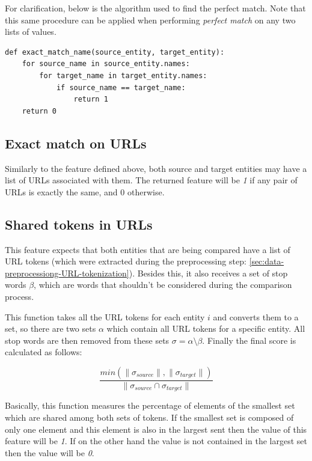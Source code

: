 \documentclass[epsfig,a4paper,11pt,titlepage,twoside,openany]{book}
\begin{document}
For clarification, below is the algorithm used to find the perfect match. Note that this same procedure can be applied when performing \textit{perfect match} on any two lists of values.

\begin{lstlisting}
def exact_match_name(source_entity, target_entity):
    for source_name in source_entity.names:
        for target_name in target_entity.names:
            if source_name == target_name:
                return 1
    return 0
\end{lstlisting}

\subsection{Exact match on URLs}
\label{sec:feature-exact-match-urls}

Similarly to the feature defined above, both source and target entities may have a list of URLs associated with them. The returned feature will be \textit{1} if any pair of URLs is exactly the same, and 0 otherwise.

\subsection{Shared tokens in URLs}
\label{sec:feature-shared-tokens-plus-urls}

This feature expects that both entities that are being compared have a list of URL tokens (which were extracted during the preprocessing step: \autoref{sec:data-preprocessiong-URL-tokenization}). Besides this, it also receives a set of stop words $\beta$, which are words that shouldn't be considered during the comparison process.

This function takes all the URL tokens for each entity $i$ and converts them to a set, so there are two sets $\alpha$ which contain all URL tokens for a specific entity. All stop words are then removed from these sets $\sigma = \alpha
\setminus \beta$. Finally the final score is calculated as follows:

\begin{equation*}
    \frac{
        min(\|\sigma_{source}\|, \|\sigma_{target}\|)}
        {\|\sigma_{source} \cap \sigma_{target}\|}
\end{equation*}

Basically, this function measures the percentage of elements of the smallest set which are shared among both sets of tokens. If the smallest set is composed of only one element and this element is also in the largest sent then the value of this feature will be \textit{1}. If on the other hand the value is not contained in the largest set then the value will be \textit{0}.
\end{document}

